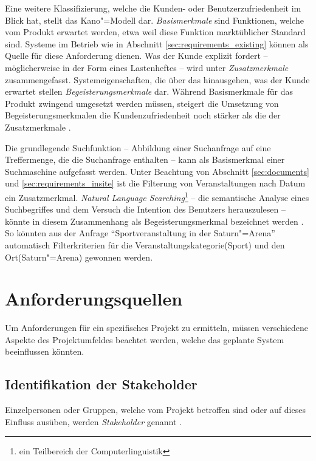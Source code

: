 Eine weitere Klassifizierung, welche die Kunden- oder Benutzerzufriedenheit im Blick hat, stellt das Kano"=Modell dar. \emph{Basismerkmale} sind Funktionen, welche vom Produkt erwartet werden, etwa weil diese Funktion marktüblicher Standard sind. Systeme im Betrieb wie in Abschnitt \ref{sec:requirements_existing} können als Quelle für diese Anforderung dienen. Was der Kunde explizit fordert -- möglicherweise in der Form eines Lastenheftes -- wird unter \emph{Zusatzmerkmale} zusammengefasst. Systemeigenschaften, die über das hinausgehen, was der Kunde erwartet stellen \emph{Begeisterungsmerkmale} dar. Während Basismerkmale für das Produkt zwingend umgesetzt werden müssen, steigert die Umsetzung von Begeisterungsmerkmalen die Kundenzufriedenheit noch stärker als die der Zusatzmerkmale \cite[S. 534]{Pohl.2008}.

Die grundlegende Suchfunktion -- Abbildung einer Suchanfrage auf eine Treffermenge, die die Suchanfrage enthalten -- kann als Basismerkmal einer Suchmaschine aufgefasst werden. Unter Beachtung von Abschnitt \ref{sec:documents} und \ref{sec:requirements_insite} ist die Filterung von Veranstaltungen nach Datum ein Zusatzmerkmal. \emph{Natural Language Searching}\footnote{ein Teilbereich der Computerlinguistik} -- die semantische Analyse eines Suchbegriffes und dem Versuch die Intention des Benutzers herauszulesen -- könnte in diesem Zusammenhang als Begeisterungsmerkmal bezeichnet werden \cite[S. 6]{Aksyonoff.2011}. So könnten aus der Anfrage \enquote{Sportveranstaltung in der Saturn"=Arena} automatisch Filterkriterien für die Veranstaltungskategorie(Sport) und den Ort(Saturn"=Arena) gewonnen werden.

\section{Anforderungsquellen}

Um Anforderungen für ein spezifisches Projekt zu ermitteln, müssen verschiedene Aspekte des Projektumfeldes beachtet werden, welche das geplante System beeinflussen könnten.

\subsection{Identifikation der Stakeholder}

Einzelpersonen oder Gruppen, welche vom Projekt betroffen sind oder auf dieses Einfluss ausüben, werden \emph{Stakeholder} genannt \cite[S. 21]{Pohl.2015}.


